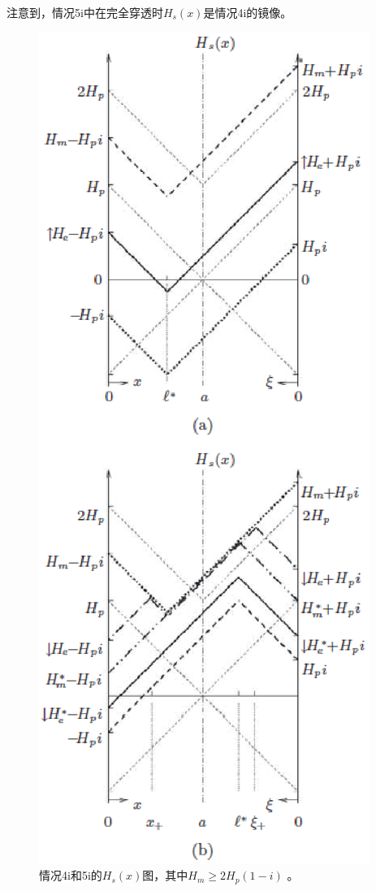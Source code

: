 注意到，情况5i中在完全穿透时$H_s(x)$是情况4i的镜像。
\begin{figure}[htbp]
	\centering
	\includegraphics[scale=0.7]{chpt7/figs/fig7.16.eps}
	\caption{情况4i和5i的$H_s(x)$图，其中$H_m\ge 2H_p(1−i)$ 。}
\end{figure}



